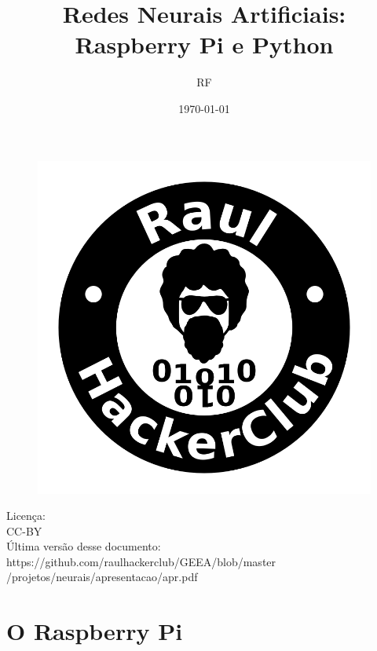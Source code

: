 \documentclass{beamer}
\author{RF}
\title{Redes Neurais Artificiais: Raspberry Pi e Python}
\date{\today}
\begin{document}

  \begin{frame}
    \begin{figure}[htpb]
    \includegraphics[scale=0.8]{salvador-logo.png}
   \end{figure}
  \end{frame}

  \frame{\maketitle}

  \frame{\tableofcontents}


  \begin{frame}
    Licença:\\
    CC-BY\\
    Última versão desse documento:\\
    https://github.com/raulhackerclub/GEEA/blob/master\\
    /projetos/neurais/apresentacao/apr.pdf
  \end{frame}




  \section{O Raspberry Pi}
\end{document}
